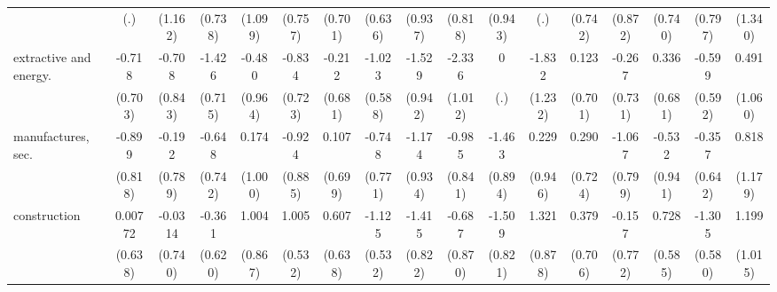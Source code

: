{\begin{tabular}{l*{16}{c}}
                    &         (.)         &     (1.162)         &     (0.738)         &     (1.099)         &     (0.757)         &     (0.701)         &     (0.636)         &     (0.937)         &     (0.818)         &     (0.943)         &         (.)         &     (0.742)         &     (0.872)         &     (0.740)         &     (0.797)         &     (1.340)         \\
[1em]
extractive and energy.&      -0.718         &      -0.708         &      -1.426\sym{*}  &      -0.480         &      -0.834         &      -0.212         &      -1.023         &      -1.529         &      -2.336\sym{*}  &           0         &      -1.832         &       0.123         &      -0.267         &       0.336         &      -0.599         &       0.491         \\
                    &     (0.703)         &     (0.843)         &     (0.715)         &     (0.964)         &     (0.723)         &     (0.681)         &     (0.588)         &     (0.942)         &     (1.012)         &         (.)         &     (1.232)         &     (0.701)         &     (0.731)         &     (0.681)         &     (0.592)         &     (1.060)         \\
[1em]
manufactures, sec.  &      -0.899         &      -0.192         &      -0.648         &       0.174         &      -0.924         &       0.107         &      -0.748         &      -1.174         &      -0.985         &      -1.463         &       0.229         &       0.290         &      -1.067         &      -0.532         &      -0.357         &       0.818         \\
                    &     (0.818)         &     (0.789)         &     (0.742)         &     (1.000)         &     (0.885)         &     (0.699)         &     (0.771)         &     (0.934)         &     (0.841)         &     (0.894)         &     (0.946)         &     (0.724)         &     (0.799)         &     (0.941)         &     (0.642)         &     (1.179)         \\
[1em]
construction        &     0.00772         &     -0.0314         &      -0.361         &       1.004         &       1.005         &       0.607         &      -1.125\sym{*}  &      -1.415         &      -0.687         &      -1.509         &       1.321         &       0.379         &      -0.157         &       0.728         &      -1.305\sym{*}  &       1.199         \\
                    &     (0.638)         &     (0.740)         &     (0.620)         &     (0.867)         &     (0.532)         &     (0.638)         &     (0.532)         &     (0.822)         &     (0.870)         &     (0.821)         &     (0.878)         &     (0.706)         &     (0.772)         &     (0.585)         &     (0.580)         &     (1.015)         \\

\end{tabular}}
